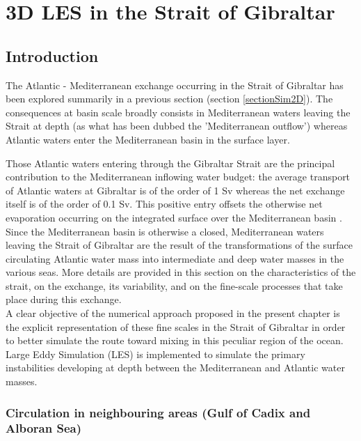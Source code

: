 \section{3D LES in the Strait of Gibraltar}
\label{sectionSim3D}
\subsection{Introduction}

The Atlantic - Mediterranean exchange occurring in the Strait of Gibraltar has been explored summarily in a previous section (section \ref{sectionSim2D}). The consequences at basin scale broadly consists in Mediterranean waters leaving the Strait at depth (as what has been dubbed the 'Mediterranean outflow') whereas Atlantic waters enter the Mediterranean basin in the surface layer.

Those Atlantic waters entering through the Gibraltar Strait are the principal contribution to the Mediterranean inflowing water budget: the average transport of Atlantic waters at Gibraltar is of the order of 1 Sv whereas the net exchange itself is of the order of 0.1 Sv. This positive entry offsets the otherwise net evaporation occurring on the integrated surface over the Mediterranean basin \citep{bryden_1994}.
Since the Mediterranean basin is otherwise a closed, Mediterranean waters leaving the Strait of Gibraltar are the result of the transformations of the surface circulating Atlantic water mass into intermediate and deep water masses in the various seas.
More details are provided in this section on the characteristics of the strait, on the exchange, its variability, and on the fine-scale processes that take place during this exchange.\\
A clear objective of the numerical approach proposed in the present chapter is the explicit representation of these fine scales in the Strait of Gibraltar in order to better simulate the route toward mixing in this peculiar region of the ocean. Large Eddy Simulation (LES) is implemented to simulate the primary instabilities developing at depth between the Mediterranean and Atlantic water masses.

\subsubsection{Circulation in neighbouring areas (Gulf of Cadix and Alboran Sea)}

